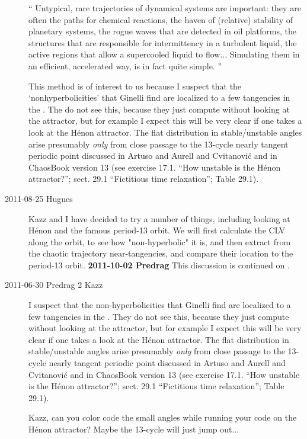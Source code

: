 \begin{description}
``
Untypical, rare trajectories of dynamical systems are important: they are
often the paths for chemical reactions, the haven of (relative) stability
of planetary systems, the rogue waves that are detected in oil platforms,
the structures that are responsible for intermittency in a turbulent
liquid, the active regions that allow a supercooled liquid to flow...
Simulating them in an efficient, accelerated way, is in fact quite
simple.
''

This method is of interest to us because I suspect that the
`nonhyperbolicities' that Ginelli\etal{} find are
localized to a few tangencies in the \statesp. The do not see this,
because they just compute without looking at the attractor, but for
example I expect this will be very clear if one takes a look at the
H\'enon attractor. The flat distribution in stable/unstable angles arise
presumably {\em only} from close passage to the 13-cycle nearly tangent
periodic point discussed in Artuso and Aurell and
Cvitanovi{\'{c}} and in ChaosBook version 13 (see exercise
17.1. ``How unstable is the H\'enon attractor?''; sect. 29.1 ``Fictitious
time relaxation''; Table 29.1).

\item[2011-08-25 Hugues]
Kazz and I have decided to try a number of things, including looking at
H\'enon and the famous period-13 orbit. We will first calculate the CLV
along the orbit, to see how "non-hyperbolic" it is, and then extract from
the chaotic trajectory near-tangencies, and compare their location to the
period-13 orbit. {\bf 2011-10-02 Predrag} This discussion is continued on
.

\item[2011-06-30 Predrag 2 Kazz]
I suspect that the  non-hyperbolicities that
Ginelli\etal{} find are localized to a few tangencies in
the \statesp. They do not see this, because they just compute without
looking at the attractor, but for example I expect this will be very
clear if one takes a look at the H\'enon attractor. The flat distribution
in stable/unstable angles arise presumably {\em only} from close passage
to the 13-cycle nearly tangent periodic point discussed in Artuso and
Aurell and Cvitanovi{\'{c}} and in ChaosBook version 13 (see
exercise 17.1. ``How unstable is the H\'enon attractor?''; sect. 29.1
``Fictitious time relaxation''; Table 29.1).

Kazz, can you color code the small angles while running your code on the
H\'enon attractor? Maybe the 13-cycle will just jump out...


\end{description}
